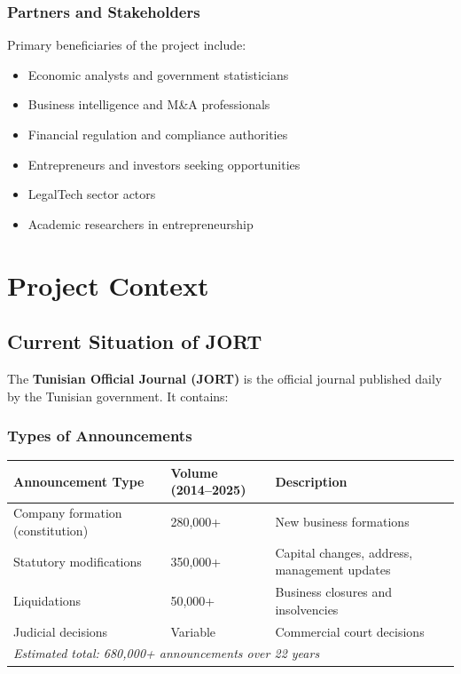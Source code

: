 \documentclass[12pt,a4paper]{report}
\begin{document}
\subsection{Partners and Stakeholders}

Primary beneficiaries of the project include:
\begin{itemize}
    \item Economic analysts and government statisticians
    \item Business intelligence and M\&A professionals
    \item Financial regulation and compliance authorities
    \item Entrepreneurs and investors seeking opportunities
    \item LegalTech sector actors
    \item Academic researchers in entrepreneurship
\end{itemize}

\chapter{Project Context}

\section{Current Situation of JORT}

The \textbf{Tunisian Official Journal (JORT)} is the official journal published daily by the Tunisian government. It contains:

\subsection{Types of Announcements}

\begin{longtable}{|l|l|p{5cm}|}
\hline
\textbf{Announcement Type} & \textbf{Volume (2014--2025)} & \textbf{Description} \\
\hline
Company formation (constitution) & 280,000+ & New business formations \\
Statutory modifications & 350,000+ & Capital changes, address, management updates \\
Liquidations & 50,000+ & Business closures and insolvencies \\
Judicial decisions & Variable & Commercial court decisions \\
\hline
\multicolumn{3}{|l|}{\small \textit{Estimated total: 680,000+ announcements over 22 years}} \\
\hline
\end{longtable}
\end{document}
